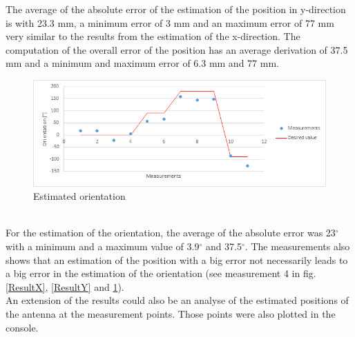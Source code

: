 The average of the absolute error of the estimation of the position in y-direction is with 23.3 mm, a minimum error of 3 mm and an maximum error of 77 mm very similar to the results from the estimation of the x-direction. The computation of the overall error of the position has an average derivation of 37.5 mm and a minimum and maximum error of 6.3 mm and 77 mm.\\
\begin{figure}[!htbp]
\centering
\includegraphics[width = 14cm]{Pictures/ResultO}
\caption{Estimated orientation}
\label{ResultO}
\end{figure}\\
For the estimation of the orientation, the average of the absolute error was 23$^\circ$ with a minimum and a maximum value of 3.9$^\circ$ and 37.5$^\circ$. The measurements also shows that an estimation of the position with a big error not necessarily leads to a big error in the estimation of the orientation (see measurement 4 in fig.\ref{ResultX},  \ref{ResultY} and \ref{ResultO}).\\
An extension of the results could also be an analyse of the estimated positions of the antenna at the measurement points. Those points were also plotted in the console. \\


